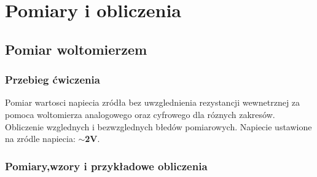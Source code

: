 \documentclass[a4paper,13pt]{extarticle}  %
\begin{document}
    \section{Pomiary i obliczenia}
        \subsection{Pomiar woltomierzem}
            \subsubsection{Przebieg ćwiczenia}
                Pomiar wartosci napiecia zródła bez uwzglednienia rezystancji wewnetrznej za
                pomoca woltomierza analogowego oraz cyfrowego dla róznych
                zakresów. Obliczenie wzglednych i bezwzglednych błedów pomiarowych.
                Napiecie ustawione na zródle napiecia: \textbf{$\sim$2V}.
            
            \subsubsection{Pomiary,wzory i przykładowe obliczenia}
                \begin{table}[H]
                    \caption{Wyniki pomiarowe oraz błędy pomiarowe dla ustalonego napięcia $\sim$ 2V dla woltomierza analogowego}
                    \centering
                \end{table}
\end{document}
